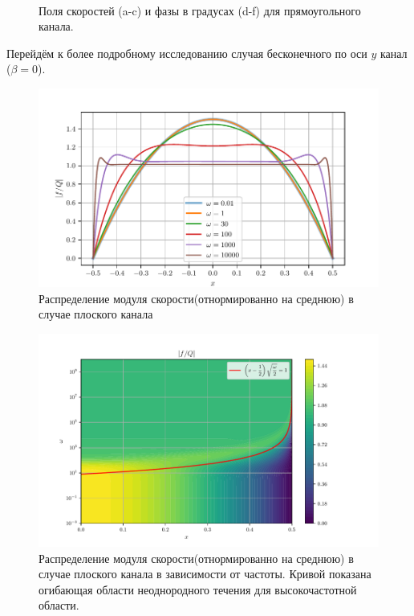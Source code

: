 \documentclass[a4paper,12pt]{article}
\theoremstyle{plain} %
\theoremstyle{definition} %
\theoremstyle{remark} %
\begin{document}
\begin{figure}[H]
\begin{minipage}[h]{\linewidth}
\end{minipage}
\vfill
\begin{minipage}[h]{\linewidth}
  \\
\end{minipage}
\caption{Поля скоростей (a-c) и фазы в градусах (d-f) для прямоугольного канала.}
\end{figure}
\newpage
Перейдём к более подробному исследованию случая бесконечного по оси $y$ канал ($\beta=0$).
\begin{figure}[H]
    \centering
    \includegraphics[]{Abs plane.pdf}
    \caption{Распределение модуля скорости(отнормированно на среднюю) в случае плоского канала}
    \label{fig:abs plane}
\end{figure}
\begin{figure}[H]
    \centering
    \includegraphics[]{Abs pic plane.pdf}
    \caption{Распределение модуля скорости(отнормированно на среднюю) в случае плоского канала в зависимости от частоты. Кривой показана огибающая области неоднородного течения для высокочастотной области.}
    \label{fig:abs plane pic}
\end{figure}
\end{document}
